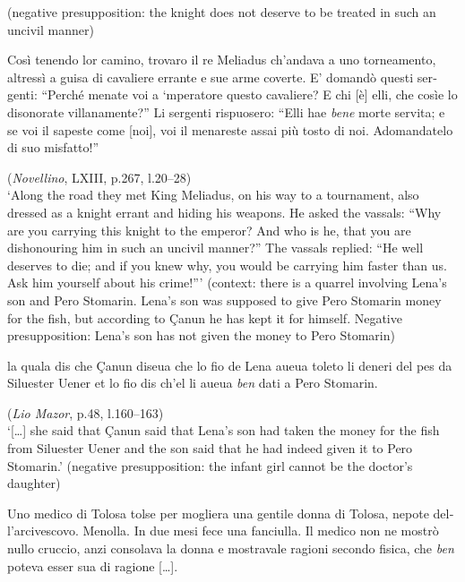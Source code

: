 \documentclass[output=paper]{langsci/langscibook}
\begin{document}
\ea\label{ex:schifano:12.7}
    \ea (negative presupposition: the knight does not deserve to be treated in
        such an uncivil manner)\\
        \begin{otherlanguage}{italian}
        Così tenendo lor camino, trovaro il re
        Meliadus ch’andava a uno torneamento, altressì a guisa di cavaliere errante
        e sue arme coverte. E’ domandò questi sergenti: “Perché menate voi a ‘mperatore
        questo cavaliere? E chi [è] elli, che cosìe lo disonorate villanamente?” Li
        sergenti rispuosero: “Elli hae \textit{bene} morte servita; e se voi il sapeste
        come [noi], voi il menareste assai più tosto di noi. Adomandatelo di suo
        misfatto!”
        \end{otherlanguage}\hfill(\emph{Novellino}, LXIII, p.267, l.20--28)\\
        \enquote*{Along the road they met King Meliadus, on his way to a tournament,
        also dressed as a knight errant and hiding his weapons. He asked the
        vassals: ``Why are you carrying this knight to the emperor? And who is
        he, that you are dishonouring him in such an uncivil manner?'' The
        vassals replied: ``He well deserves to die; and if you knew why, you
        would be carrying him faster than us. Ask him yourself about his
        crime!''}
    \ex (context: there is a quarrel involving Lena’s son and Pero Stomarin.
        Lena’s son was supposed to give Pero Stomarin money for the fish, but
        according to Çanun he has kept it for himself. Negative presupposition:
        Lena’s son has not given the money to Pero Stomarin)\\
        \begin{otherlanguage}{italian}
        \relax[\dots] la quala dis che Çanun diseua che lo fio de Lena aueua
        toleto li deneri del pes da Siluester Uener et lo fio dis ch’el li
        aueua \textit{ben} dati a Pero Stomarin.
        \end{otherlanguage}\hfill
        (\emph{Lio Mazor}, p.48, l.160--163)\\
        \enquote*{[\dots] she said that Çanun said that Lena’s son had taken
        the money for the fish from Siluester Uener and the son said that
        he had indeed given it to Pero Stomarin.}
    \ex (negative presupposition: the infant girl cannot be the doctor’s
        daughter)\\
        \begin{otherlanguage}{italian}
        Uno medico di Tolosa tolse per mogliera una gentile donna di
        Tolosa, nepote dell’arcivescovo. Menolla. In due mesi fece una
        fanciulla. Il medico non ne mostrò nullo cruccio, anzi consolava la
        donna e mostravale ragioni secondo fisica, che \textit{ben} poteva
        esser sua di ragione [\dots{}].
        \end{otherlanguage}\hfill
\end{document}
